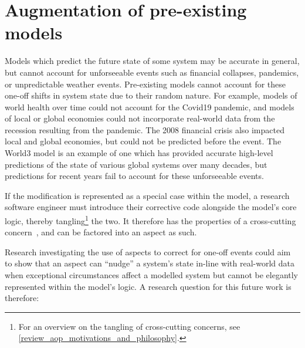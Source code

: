 





\section{Augmentation of pre-existing models}\label{future_work_nudge_model_state}

Models which predict the future state of some system may be accurate in general,
but cannot account for unforseeable events such as financial collapses,
pandemics, or unpredictable weather events. Pre-existing models cannot account
for these one-off shifts in system state due to their random nature. For
example, models of world health over time could not account for the Covid19
pandemic, and models of local or global economies could not incorporate
real-world data from the recession resulting from the pandemic. The 2008
financial crisis also impacted local and global economies, but could not be
predicted before the event. The World3 model is an example of one which has
provided accurate high-level predictions of the state of various global systems
over many decades, but predictions for
recent years fail to account for these unforseeable events.

If the modification is represented as a special case within the model, a
research software engineer must introduce their corrective code alongside the
model's core logic, thereby tangling\footnote{For an overview on the tangling of
cross-cutting concerns, see \cref{review_aop_motivations_and_philosophy}.} the
two. It therefore has the properties of a cross-cutting
concern~\cite{kiczales1997aspect,filman2000aspect}, and can be factored into an
aspect as such. 

Research investigating the use of aspects to correct for one-off events could
aim to show that an aspect can ``nudge'' a system's state in-line with
real-world data when exceptional circumstances affect a modelled system but
cannot be elegantly represented within the model's logic. A research question
for this future work is therefore:

